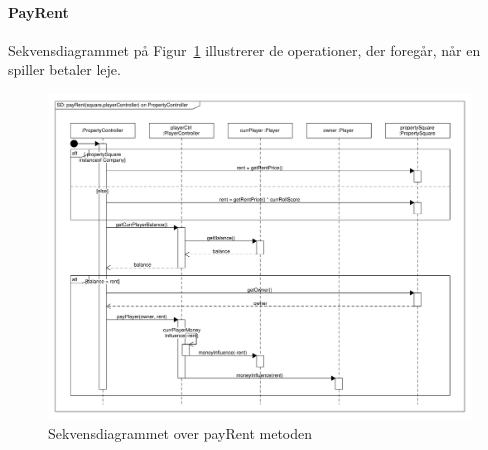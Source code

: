\documentclass[class=article, crop=false]{standalone}
\begin{document}
    \paragraph{PayRent\\}
    Sekvensdiagrammet på Figur~\ref{fig:SD_pay_rent} illustrerer de operationer, der foregår, når en spiller betaler leje.
    \begin{figure}[H]

\hbox{\hspace{-2.7cm}\includegraphics[scale=0.54]{diagrams/SD_pay_rent.pdf}}

        \caption{Sekvensdiagrammet over payRent metoden}\label{fig:SD_pay_rent}
    \end{figure}
    \newpage
\end{document}
